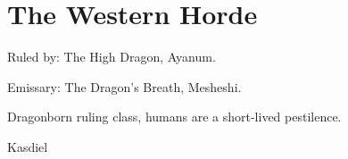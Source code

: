 \section{The Western Horde}

Ruled by: The High Dragon, Ayanum.

Emissary: The Dragon's Breath, Mesheshi.

Dragonborn ruling class, humans are a short-lived pestilence.

Kasdiel
